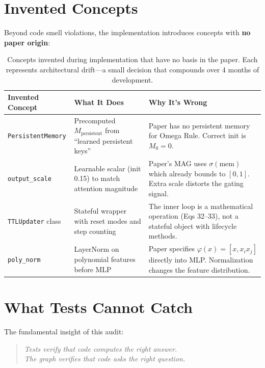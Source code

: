 \documentclass[11pt,letterpaper]{article}
\begin{document}
\section{Invented Concepts}

Beyond code smell violations, the implementation introduces concepts with
\textbf{no paper origin}:

\begin{table}[h!]
\centering
\small
\begin{tabular}{@{}lp{5cm}p{5cm}@{}}
\toprule
\textbf{Invented Concept} & \textbf{What It Does} & \textbf{Why It's Wrong} \\
\midrule
\texttt{PersistentMemory} &
  Precomputed $M_\text{persistent}$ from ``learned persistent keys'' &
  Paper has no persistent memory for Omega Rule. Correct init is $M_0 = 0$. \\
\addlinespace
\texttt{output\_scale} &
  Learnable scalar (init 0.15) to match attention magnitude &
  Paper's MAG uses $\sigma(\text{mem})$ which already bounds to $[0,1]$.
  Extra scale distorts the gating signal. \\
\addlinespace
\texttt{TTLUpdater} class &
  Stateful wrapper with reset modes and step counting &
  The inner loop is a mathematical operation (Eqs 32--33), not a
  stateful object with lifecycle methods. \\
\addlinespace
\texttt{poly\_norm} &
  LayerNorm on polynomial features before MLP &
  Paper specifies $\varphi(x) = [x, x_i x_j]$ directly into MLP.
  Normalization changes the feature distribution. \\
\bottomrule
\end{tabular}
\caption{Concepts invented during implementation that have no basis in the paper.
Each represents architectural drift---a small decision that compounds over
4 months of development.}
\label{tab:invented}
\end{table}

\section{What Tests Cannot Catch}

The fundamental insight of this audit:

\begin{quote}
\emph{Tests verify that code computes the right answer.\\
The graph verifies that code asks the right question.}
\end{quote}
\end{document}
